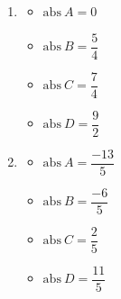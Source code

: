 %
%
  \begin{enumerate}[cols=2]
    \item
          \begin{itemize}[label=]
            \item $\mathrm{abs}~A = 0$
            \item $\mathrm{abs}~B = \dfrac{5}{4}$
            \item $\mathrm{abs}~C = \dfrac{7}{4}$
            \item $\mathrm{abs}~D = \dfrac{9}{2}$
          \end{itemize}
    \item
          \begin{itemize}[label=]
            \item $\mathrm{abs}~A = \dfrac{-13}{5}$
            \item $\mathrm{abs}~B = \dfrac{-6}{5}$
            \item $\mathrm{abs}~C = \dfrac{2}{5}$
            \item $\mathrm{abs}~D = \dfrac{11}{5}$
          \end{itemize}
  \end{enumerate}
